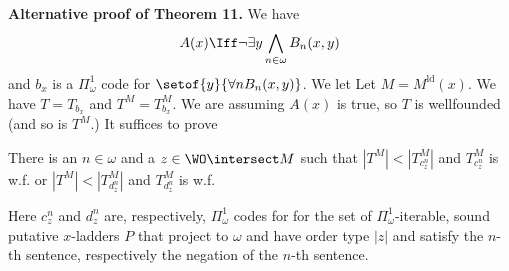 \documentclass[oneside,12pt]{amsart}
\begin{document}
\textbf{Alternative proof of Theorem 11.}  We have
$$A(x) \Iff \neg \exists y \bigwedge_{n\in\omega}B_n(x,y)$$
and $b_x$ is a $\Pi^1_{\omega}$ code for
$\setof{y}{\forall n B_n(x,y)}$.
We let Let $M=M^{\text{ld}}(x)$.
We have $T = T_{b_x}$ and $T^M =T^M_{b_x}$. We are assuming $A(x)$ is true,
so $T$ is wellfounded (and so is $T^M$.) It suffices to prove

\begin{claim}
There is an $n\in\omega$ and a $z\in\WO\intersect M$ such that
$|T^M| < |T^M_{c^n_z}|$ and $T^M_{c^n_z}$ is w.f. or
$|T^M| < |T^M_{d^n_z}|$ and $T^M_{d^n_z}$ is w.f.
\end{claim}

Here $c^n_z$ and $d^n_z$ are, respectively,
 $\Pi^1_{\omega}$ codes for for the set of $\Pi^1_{\omega}$-iterable, sound putative $x$-ladders $P$ that project to
$\omega$ and have order type $|z|$ and satisfy the $n$-th sentence, respectively
the negation of the $n$-th sentence.
\end{document}
